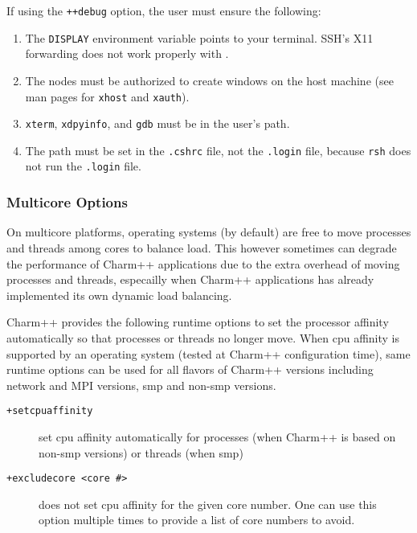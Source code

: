If using the {\tt ++debug} option, the user must ensure the
following:
\begin{enumerate}

\item The {\tt DISPLAY} environment variable points to your terminal.
SSH's X11 forwarding does not work properly with \charmpp{}.

\item The nodes must be authorized to create windows on the host machine (see
man pages for {\tt xhost} and {\tt xauth}).

\item {\tt xterm}, {\tt xdpyinfo},  and {\tt gdb} must be in
the user's path.

\item The path must be set in the {\tt .cshrc} file, not the {\tt .login}
file, because {\tt rsh} does not run the {\tt .login} file. 

\end{enumerate}


\subsubsection{Multicore Options}

On multicore platforms, operating systems (by default) are free to move
processes and threads among cores to balance load. This however sometimes can
degrade the performance of Charm++ applications due to the extra overhead of
moving processes and threads, especailly when Charm++ applications has already
implemented its own dynamic load balancing.

Charm++ provides the following runtime options to set the processor affinity
automatically so that processes or threads no longer move. When cpu affinity
is supported by an operating system (tested at Charm++ configuration time),
same runtime options can be used for all flavors of Charm++ versions including
network and MPI versions, smp and non-smp versions.

\begin{description}

\item[{\tt +setcpuaffinity}]             set cpu affinity automatically for processes (when Charm++ is based on non-smp versions) or threads (when smp)

\item[{\tt +excludecore <core \#>}]       does not set cpu affinity for the given core number. One can use this option multiple times to provide a list of core numbers to avoid.

\end{description}

